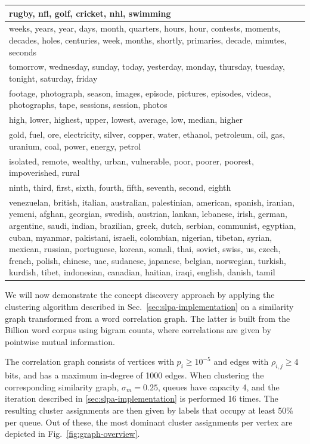 \documentclass{kais}
\newcommand{\rn}[1]{\rho_{#1}}
\begin{document}
\begin{table}
\begin{center}
\begin{tabular*}{\textwidth}{p{\textwidth-0.3cm}}
rugby, nfl, golf, cricket, nhl, swimming\\
\hline
weeks, years, year, days, month, quarters, hours, hour, contests, moments, decades, 
holes, centuries, week, months, shortly, primaries, decade, minutes, seconds\\
\hline
tomorrow, wednesday, sunday, today, yesterday, monday, thursday, tuesday, tonight, 
saturday, friday\\
\hline
footage, photograph, season, images, episode, pictures, episodes, videos, photographs, 
tape, sessions, session, photos\\
\hline
high, lower, highest, upper, lowest, average, low, median, higher\\
\hline
gold, fuel, ore, electricity, silver, copper, water, ethanol, petroleum, oil, gas, uranium, 
coal, power, energy, petrol\\
\hline
isolated, remote, wealthy, urban, vulnerable, poor, poorer, poorest, impoverished, rural\\
\hline
ninth, third, first, sixth, fourth, fifth, seventh, second, eighth\\
\hline
venezuelan, british, italian, australian, palestinian, american, spanish, iranian, yemeni, afghan, 
georgian, swedish, austrian, lankan, lebanese, irish, german, argentine, saudi, indian, brazilian, 
greek, dutch, serbian, communist, egyptian, cuban, myanmar, pakistani, israeli, colombian, 
nigerian, tibetan, syrian, mexican, russian, portuguese, korean, somali, thai, soviet, swiss, us, 
czech, french, polish, chinese, uae, sudanese, japanese, belgian, norwegian, turkish, kurdish, 
tibet, indonesian, canadian, haitian, iraqi, english, danish, tamil\\
\hline
\end{tabular*}
\end{center}
\label{table:selected-clusters}
\end{table}

We will now demonstrate the concept discovery approach by applying the clustering algorithm described in 
Sec.~\ref{sec:slpa-implementation} on a similarity graph transformed from a word correlation graph.
The latter is built from the Billion word corpus using bigram counts, where correlations are given by
pointwise mutual information. 

The correlation graph consists of vertices with $p_i \geq 10^{-5}$ and edges with $\rn{i,j} \geq 4$ bits, and has 
a maximum in-degree of 1000 edges. When clustering the corresponding similarity graph, 
$\sigma_m = 0.25$, queues have capacity 4, and the iteration described in \ref{sec:slpa-implementation} is performed 16 times. 
The resulting cluster assignments are then given by labels that occupy at least 50\% per queue. Out of these, the most 
dominant cluster assignments per vertex are depicted in Fig.~\ref{fig:graph-overview}.
\end{document}

